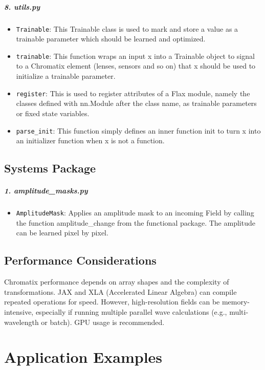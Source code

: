 \documentclass[a4paper,12pt]{report}
\begin{document}
\paragraph*{8. \textbf{utils.py}}
\begin{itemize}
  \item \texttt{Trainable}: This Trainable class is used to mark and store a value as a trainable parameter which should be learned and optimized.
  \item \texttt{trainable}: This function wraps an input x into a Trainable object to signal to a Chromatix element (lenses, sensors and so on) that x should be used to initialize a trainable parameter.
  \item \texttt{register}: This is used to register attributes of a Flax module, namely the classes defined with nn.Module after the class name, as trainable parameters or fixed state variables.
  \item \texttt{parse\_init}: This function simply defines an inner function init to turn x into an initializer function when x is not a function.
\end{itemize}

\section{Systems Package}
\paragraph*{1. \textbf{amplitude\_masks.py}}
\begin{itemize}
  \item \texttt{AmplitudeMask}: Applies an amplitude mask to an incoming Field by calling the function amplitude\_change from the functional package. The amplitude can be learned pixel by pixel.
\end{itemize}

\section{Performance Considerations}
Chromatix performance depends on array shapes and the complexity of transformations. JAX and XLA (Accelerated Linear Algebra) can compile repeated operations for speed. However, high-resolution fields can be memory-intensive, especially if running multiple parallel wave calculations (e.g., multi-wavelength or batch). GPU usage is recommended.

\chapter{Application Examples}
\end{document}
